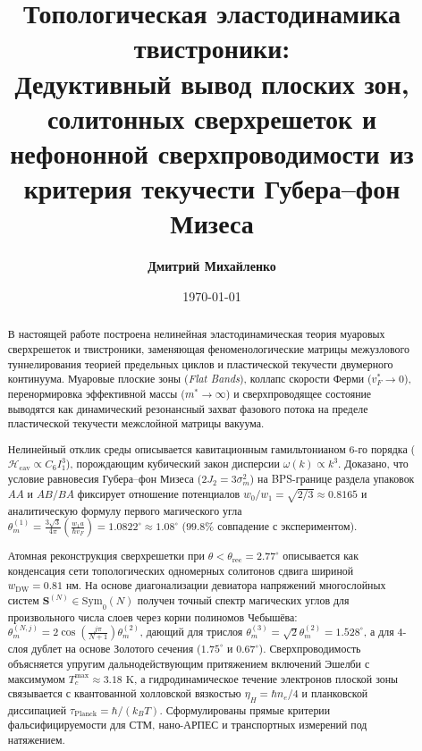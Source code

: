 \documentclass[12pt,a4paper]{article}
\title{\textbf{Топологическая эластодинамика твистроники:\\ Дедуктивный вывод плоских зон, солитонных сверхрешеток и нефононной сверхпроводимости из критерия текучести Губера--фон Мизеса}}
\author{\textbf{Дмитрий Михайленко}}
\date{\today}
\begin{document}
	
	\maketitle
	
	\begin{abstract}
		В настоящей работе построена нелинейная эластодинамическая теория муаровых сверхрешеток и твистроники, заменяющая феноменологические матрицы межузлового туннелирования теорией предельных циклов и пластической текучести двумерного континуума. Муаровые плоские зоны (\textit{Flat Bands}), коллапс скорости Ферми ($v_F^* \to 0$), перенормировка эффективной массы ($m^* \to \infty$) и сверхпроводящее состояние выводятся как динамический резонансный захват фазового потока на пределе пластической текучести межслойной матрицы вакуума.
		
		Нелинейный отклик среды описывается кавитационным гамильтонианом 6-го порядка ($\mathcal{H}_{\text{cav}} \propto C_6 I_1^3$), порождающим кубический закон дисперсии $\omega(k) \propto k^3$. Доказано, что условие равновесия Губера--фон Мизеса ($2J_2 = 3\sigma_m^2$) на BPS-границе раздела упаковок $AA$ и $AB/BA$ фиксирует отношение потенциалов $w_0/w_1 = \sqrt{2/3} \approx 0.8165$ и аналитическую формулу первого магического угла $\theta_m^{(1)} = \frac{3\sqrt{3}}{4\pi}\left(\frac{w_1 a}{\hbar v_F}\right) = 1.0822^\circ \approx 1.08^\circ$ ($99.8\%$ совпадение с экспериментом). 
		
		Атомная реконструкция сверхрешетки при $\theta < \theta_{\text{rec}} = 2.77^\circ$ описывается как конденсация сети топологических одномерных солитонов сдвига шириной $w_{\text{DW}} = 0.81\text{ нм}$. На основе диагонализации девиатора напряжений многослойных систем $\mathbf{S}^{(N)} \in \mathrm{Sym}_0(N)$ получен точный спектр магических углов для произвольного числа слоев через корни полиномов Чебышёва: $\theta_m^{(N, j)} = 2\cos\left(\frac{j\pi}{N+1}\right)\theta_m^{(2)}$, дающий для трислоя $\theta_m^{(3)} = \sqrt{2}\theta_m^{(2)} = 1.528^\circ$, а для 4-слоя дублет на основе Золотого сечения ($1.75^\circ$ и $0.67^\circ$). Сверхпроводимость объясняется упругим дальнодействующим притяжением включений Эшелби с максимумом $T_c^{\text{max}} \approx 3.18\text{ K}$, а гидродинамическое течение электронов плоской зоны связывается с квантованной холловской вязкостью $\eta_H = \hbar n_e / 4$ и планковской диссипацией $\tau_{\text{Planck}} = \hbar / (k_B T)$. Сформулированы прямые критерии фальсифицируемости для СТМ, нано-АРПЕС и транспортных измерений под натяжением.
	\end{abstract}
	
\end{document}
